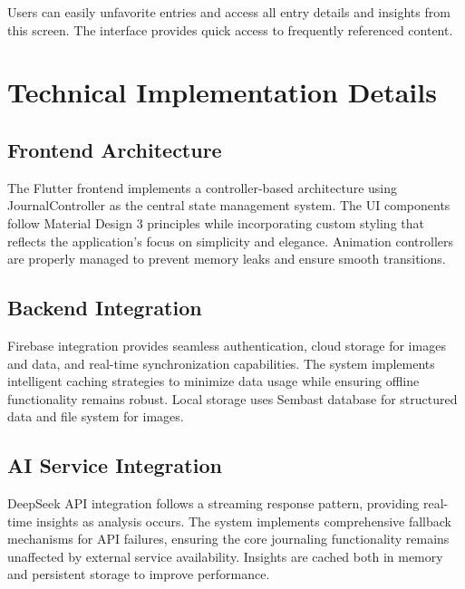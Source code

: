 
Users can easily unfavorite entries and access all entry details and insights from this screen. The interface provides quick access to frequently referenced content.

\section{Technical Implementation Details}

\subsection{Frontend Architecture}

The Flutter frontend implements a controller-based architecture using JournalController as the central state management system. The UI components follow Material Design 3 principles while incorporating custom styling that reflects the application's focus on simplicity and elegance. Animation controllers are properly managed to prevent memory leaks and ensure smooth transitions.

\subsection{Backend Integration}

Firebase integration provides seamless authentication, cloud storage for images and data, and real-time synchronization capabilities. The system implements intelligent caching strategies to minimize data usage while ensuring offline functionality remains robust. Local storage uses Sembast database for structured data and file system for images.

\subsection{AI Service Integration}

DeepSeek API integration follows a streaming response pattern, providing real-time insights as analysis occurs. The system implements comprehensive fallback mechanisms for API failures, ensuring the core journaling functionality remains unaffected by external service availability. Insights are cached both in memory and persistent storage to improve performance.


